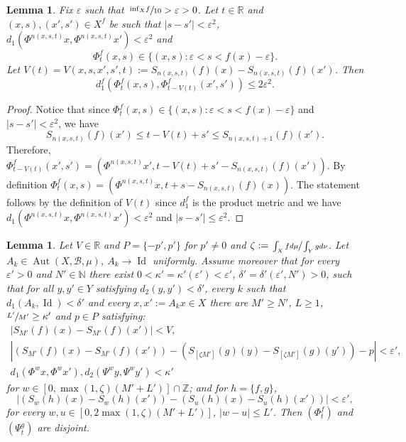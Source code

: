 \documentclass[JEP,XML,SOM,Unicode,NoEqCountersInSection]{cedram}
\let\mathcal\mathscr
\let\epsilon\varepsilon
\DeclareMathOperator{\Aut}{Aut}
\DeclareMathOperator{\Id}{Id}
\theoremstyle{definition}
\theoremstyle{plain}
\newtheorem{lemma}[definition]{Lemma}
\newcommand\NN{\mathbb{N}}
\newcommand\RR{\mathbb{R}}
\newcommand\ZZ{\mathbb{Z}}
\newcommand\cB{\mathcal{B}}
\begin{document}
\begin{lemma}\label{lem:bew} Fix $\epsilon$ such that $\sfrac{\inf_X\!f}{10}>\epsilon>0$. Let $t\in \RR$ and $(x,s),(x',s')\in X^f$ be such that $|s-s'|<\epsilon^2$, $d_1(\Phi^{n(x,s,t)}x,\Phi^{n(x,s,t)}x')<\epsilon^2$ and
\[
\Phi_t^f(x,s)\in \{(x,s): \epsilon<s<f(x)-\epsilon\}.
\]
Let $V(t)=V(x,s,x',s', t):=S_{n(x,s,t)}(f)(x)-S_{n(x,s,t)}(f)(x')$. Then
\[
d_1^f(\Phi_t^f(x,s),\Phi_{t-V(t)}^f(x',s'))\leq 2\epsilon^2.
\]
\end{lemma}
\begin{proof}Notice that since $\Phi_t^f(x,s)\in \{(x,s): \epsilon<s<f(x)-\epsilon\}$ and $|s-s'|<\epsilon^2$, we have
\[
S_{n(x,s,t)}(f)(x')\leq t-V(t)+s' \leq S_{n(x,s,t)+1}(f)(x').
\]
Therefore, $\Phi_{t-V(t)}^f(x',s')=(\Phi^{n(x,s,t)}x',t-V(t)+s'-S_{n(x,s,t)}(f)(x'))$. By definition $\Phi_{t}^f(x,s)=(\Phi^{n(x,s,t)}x,t+s-S_{n(x,s,t)}(f)(x))$. The statement follows by the definition of $V(t)$ since $d_1^f$ is the product metric and we have $d_1(\Phi^{n(x,s,t)}x,\Phi^{n(x,s,t)}x')<\epsilon^2$ and $|s-s'|\leq\epsilon^2$.
\end{proof}

\begin{lemma}\label{cocycle} Let $V\in \RR$ and $P=\{-p',p'\}$ for $p'\neq 0$ and
$\zeta:=\sfrac{\int_Xf d\mu}{\int_Yg d\nu}$. Let $A_k\in \Aut(X,\cB,\mu)$,
$A_k\to \Id$ uniformly. Assume moreover that for every $\epsilon'>0$ and $N'\in \NN$ there exist $0<\kappa'=\kappa'(\epsilon')<\epsilon'$, $\delta'=\delta'(\epsilon',N')>0$, such that for all $y,y'\in Y$ satisfying $d_2(y,y')<\delta'$, every $k$ such that $d_1(A_k,\Id)<\delta'$ and every $x,x':=A_{k}x\in X$ there are $M'\geq N'$, $L\geq 1$, $\sfrac{L'}{M'}\geq \kappa'$ and $p\in P$ satisfying:
\begin{gather}\label{eq.bounded}
|S_{M'}(f)(x)-S_{M'}(f)(x')|<V,
\\
\label{forw.coc}
|(S_{M'}(f)(x)-S_{M'}(f)(x'))-(S_{[\zeta M']}(g)(y)-S_{[\zeta M']}(g)(y'))-p|<\epsilon',
\\
\label{base:close}
d_1(\Phi^wx,\Phi^wx'), d_2(\Psi^wy,\Psi^wy')<\kappa'
\end{gather}
for $w\in [0,\max(1,\zeta)(M'+L')]\cap \ZZ$; and for $h=\{f,g\}$,
\begin{equation}\label{forw.tight}
|(S_w(h)(x)-S_w(h)(x'))-(S_u(h)(x)-S_u(h)(x'))|<\epsilon',
\end{equation}
for every $w,u\in[0,2\max(1,\zeta) (M'+L')]$, $|w-u|\leq L'$.
Then $(\Phi_t^f)$ and $(\Psi_t^g)$ are disjoint.
\end{lemma}
\end{document}
